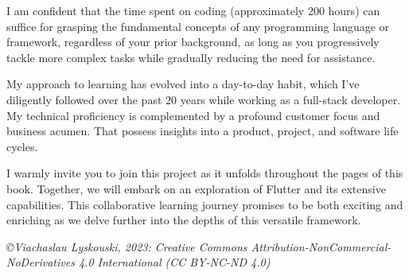 \noindent I am confident that the time spent on coding (approximately 200 hours) can suffice for grasping the 
fundamental concepts of any programming language or framework, regardless of your prior background, as long as you 
progressively tackle more complex tasks while gradually reducing the need for assistance.

\vspace{3mm}

\noindent My approach to learning has evolved into a day-to-day habit, which I've diligently followed over the past 
20 years while working as a full-stack developer. My technical proficiency is complemented by a profound customer 
focus and business acumen. That possess insights into a product, project, and software life cycles.

\vspace{3mm}

\noindent I warmly invite you to join this project as it unfolds throughout the pages of this book. Together, we will 
embark on an exploration of Flutter and its extensive capabilities. This collaborative learning journey promises to 
be both exciting and enriching as we delve further into the depths of this versatile framework.


\vspace{1cm}


\noindent \emph{\small \copyright Viachaslau Lyskouski, 2023: Creative Commons Attribution-NonCommercial-NoDerivatives 
4.0 International (CC BY-NC-ND 4.0)}

\newpage
\thispagestyle{empty}
~